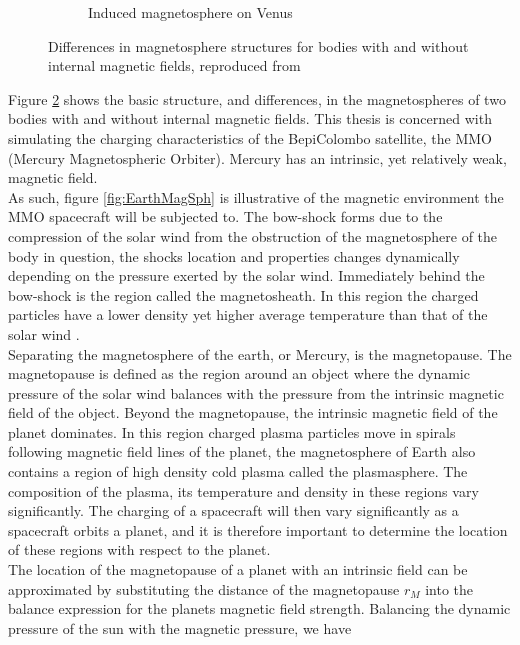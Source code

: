 \begin{figure}
\begin{subfigure}{.5\textwidth}
    \caption{Induced magnetosphere on Venus}
    \label{fig:VenusMagSph}
\end{subfigure}
\caption{Differences in magnetosphere structures for bodies with and without internal magnetic fields, reproduced from }
\label{fig:magnetosphere}
\end{figure}

Figure \ref{fig:magnetosphere} shows the basic structure, and differences, in the magnetospheres of two bodies with and without internal magnetic fields. This thesis is concerned with simulating the charging characteristics of the BepiColombo satellite, the MMO (Mercury Magnetospheric Orbiter). Mercury has an intrinsic, yet relatively weak, magnetic field. 
\\
As such, figure \ref{fig:EarthMagSph} is illustrative of the magnetic environment the MMO spacecraft will be subjected to. The bow-shock forms due to the compression of the solar wind from the obstruction of the magnetosphere of the body in question, the shocks location and properties changes dynamically depending on the pressure exerted by the solar wind. Immediately behind the bow-shock is the region called the magnetosheath. In this region the charged particles have a lower density yet higher average temperature than that of the solar wind \insertref{}. 
\\
Separating the magnetosphere of the earth, or Mercury, is the magnetopause. The magnetopause is defined as the region around an object where the dynamic pressure of the solar wind balances with the pressure from the intrinsic magnetic field of the object. Beyond the magnetopause, the intrinsic magnetic field of the planet dominates. In this region charged plasma particles move in spirals following magnetic field lines of the planet, the magnetosphere of Earth also contains a region of high density cold plasma called the plasmasphere. The composition of the plasma, its temperature and density in these regions vary significantly. The charging of a spacecraft will then vary significantly as a spacecraft orbits a planet, and it is therefore important to determine the location of these regions with respect to the planet. 
\\
The location of the magnetopause of a planet with an intrinsic field can be approximated by substituting the distance of the magnetopause $r_M$ into the balance expression for the planets magnetic field strength. Balancing the dynamic pressure of the sun with the magnetic pressure, we have 

